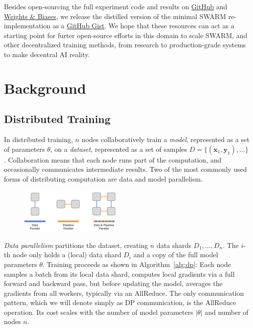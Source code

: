 \documentclass[conference, 10pt]{IEEEtran}
\begin{document}
Besides open-sourcing the full experiment code and results on
\href{https://github.com/mikasenghaas/swarm}{GitHub} and
\href{https://wandb.ai/mikasenghaas/swarm}{Weights \& Biases}, we release the
distilled version of the minimal SWARM re-implementation as a
\href{https://gist.github.com/mikasenghaas/5fa1aa77ea69f187f531a5889983c249}{GitHub
Gist}. We hope that these resources can act as a starting point for furter
open-source efforts in this domain to scale SWARM, and other decentralized
training methods, from research to production-grade systems to make decentral AI
reality.

\section{Background}

\subsection{Distributed Training}

In distributed training, $n$ nodes collaboratively train a \textit{model},
represented as a set of parameters $\theta$, on a \textit{dataset}, represented
as a set of samples $D = \{(\mathbf{x}_1, \mathbf{y}_1),\dots\}$. Collaboration 
means that each node runs part of the computation, and occasionally communicates
intermediate results. Two of the most commonly used forms of distributing
computation are data and model parallelism.

\begin{figure}[h]
    \centering
    \includegraphics[width=0.45\textwidth]{figures/parallelization.png}
    \caption{}
    \label{fig:parallelization}
\end{figure}


\textit{Data parallelism} partitions the dataset, creating $n$ data shards
$D_1,\dots,D_n$. The $i$-th node only holds a (local) data shard $D_i$ and a
copy of the full model parameters $\theta$. Training proceeds as shown in
Algorithm~\ref{alg:dp}: Each node samples a batch from its local data shard,
computes local gradients via a full forward and backward pass, but before
updating the model, averages the gradients from all workers, typically via an
AllReduce. The only communication pattern, which we will denote simply as DP
communication, is the AllReduce operation. Its cost scales with the number
of model parameters $|\theta|$ and number of nodes $n$.
\end{document}
